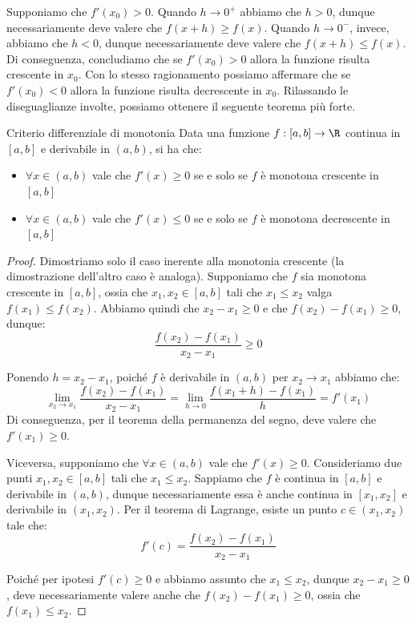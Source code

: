 \documentclass[a4paper, 12pt]{report}
\begin{document}
    Supponiamo che $f'(x_0) > 0$. Quando $h \to 0^+$ abbiamo che $h > 0$, dunque necessariamente deve valere che $f(x+h) \geq f(x)$. Quando $h \to 0^-$, invece, abbiamo che $h < 0$, dunque necessariamente deve valere che $f(x+h) \leq f(x)$. Di conseguenza, concludiamo che se $f'(x_0) > 0$ allora la funzione risulta crescente in $x_0$. Con lo stesso ragionamento possiamo affermare che se $f'(x_0) < 0$ allora la funzione risulta decrescente in $x_0$. Rilassando le diseguaglianze involte, possiamo ottenere il seguente teorema più forte. 

    \begin{framedthm}{Criterio differenziale di monotonia}
        Data una funzione $f : [a,b] \to \R$ continua in $[a,b]$ e derivabile in $(a,b)$, si ha che:
        \begin{itemize}
            \item $\forall x \in (a,b)$ vale che $f'(x) \geq 0$ se e solo se $f$ è monotona crescente in $[a,b]$
            \item $\forall x \in (a,b)$ vale che $f'(x) \leq 0$ se e solo se $f$ è monotona decrescente in $[a,b]$
        \end{itemize}
    \end{framedthm}

    \begin{proof}
        Dimostriamo solo il caso inerente alla monotonia crescente (la dimostrazione dell'altro caso è analoga). Supponiamo che $f$ sia monotona crescente in $[a,b]$, ossia che $x_1, x_2 \in [a,b]$ tali che $x_1 \leq x_2$ valga $f(x_1) \leq f(x_2)$. Abbiamo quindi che $x_2-x_1 \geq 0$ e che $f(x_2) - f(x_1) \geq 0$, dunque:
        \[\frac{f(x_2)-f(x_1)}{x_2-x_1} \geq 0\]

        Ponendo $h = x_2-x_1$, poiché $f$ è derivabile in $(a,b)$ per $x_2 \to x_1$ abbiamo che:
        \[\lim_{x_2 \to x_1} \frac{f(x_2)-f(x_1)}{x_2-x_1} = \lim_{h \to 0} \frac{f(x_1+h)-f(x_1)}{h} = f'(x_1)\]
        Di conseguenza, per il teorema della permanenza del segno, deve valere che $f'(x_1) \geq 0$.

        Viceversa, supponiamo che $\forall x \in (a,b)$ vale che $f'(x) \geq 0$. Consideriamo due punti $x_1,x_2 \in [a,b]$ tali che $x_1 \leq x_2$. Sappiamo che $f$ è continua in $[a,b]$ e derivabile in $(a,b)$, dunque necessariamente essa è anche continua in $[x_1,x_2]$ e derivabile in $(x_1,x_2)$. Per il teorema di Lagrange, esiste un punto $c \in (x_1,x_2)$ tale che:
        \[f'(c) = \frac{f(x_2)-f(x_1)}{x_2-x_1}\]

        Poiché per ipotesi $f'(c) \geq 0$ e abbiamo assunto che $x_1 \leq x_2$, dunque $x_2-x_1 \geq 0$, deve necessariamente valere anche che $f(x_2) - f(x_1) \geq 0$, ossia che $f(x_1) \leq x_2$.
    \end{proof}
\end{document}
